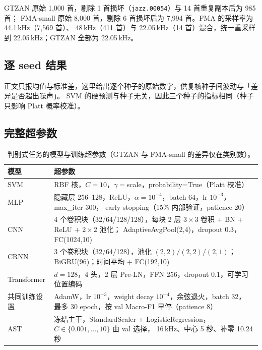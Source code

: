 \documentclass[UTF8,10pt,a4paper]{ctexart}
\begin{document}
GTZAN 原始 1,000 首，剔除 1 首损坏（\texttt{jazz.00054}）与 14 首重复副本后为 985 首；
FMA-small 原始 8,000 首，剔除 6 首损坏后为 7,994 首。FMA 的采样率为 44.1\,kHz（7,569 首）、
48\,kHz（411 首）与 22.05\,kHz（14 首）混合，统一重采样到 22.05\,kHz；GTZAN 全部为 22.05\,kHz。

\subsection{逐 seed 结果}\label{sec:perseed}

正文只报均值与标准差，这里给出逐个种子的原始数字，供复核种子间波动与「差异是否超出噪声」。
SVM 的硬预测与种子无关，因此三个种子的指标相同（种子只影响 Platt 概率校准）。





\subsection{完整超参数}

\begin{table}[H]
\centering\small
\caption{判别式任务的模型与训练超参数（GTZAN 与 FMA-small 的差异仅在类别数）。}
\label{tab:hyper}
\begin{tabular}{l p{9.5cm}}
\toprule
模型 & 超参数\\
\midrule
SVM & RBF 核，$C=10$，$\gamma=$scale，probability=True（Platt 校准）\\
MLP & 隐藏层 256--128，ReLU，$\alpha=10^{-4}$，batch 64，lr $10^{-3}$，max\_iter 300，
early stopping（15\% 内部验证，patience 20）\\
CNN & 4 个卷积块（32/64/128/128），每块 2 层 $3\times3$ 卷积 + BN + ReLU + $2\times2$ 池化；
AdaptiveAvgPool(2,4)，dropout 0.3，FC(1024,10)\\
CRNN & 3 个卷积块（32/64/128），池化 $(2,2)/(2,2)/(2,1)$；BiGRU(96)；时间平均 + FC(192,10)\\
Transformer & $d=128$，4 头，2 层 Pre-LN，FFN 256，dropout 0.1，可学习位置编码\\
共同训练设置 & AdamW，lr $10^{-3}$，weight decay $10^{-4}$，余弦退火，batch 32，
最多 30 epoch，按 val Macro-F1 早停（patience 8）\\
AST & 冻结主干，StandardScaler + LogisticRegression，$C\in\{0.001,\dots,10\}$ 由 val 选择，
16\,kHz、中心 5 秒、补零 10.24 秒\\
\bottomrule
\end{tabular}
\end{table}
\end{document}
